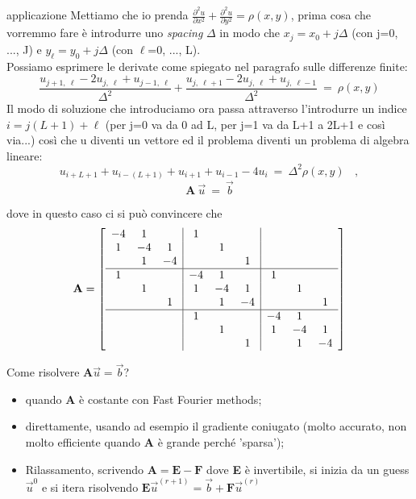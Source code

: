 \documentclass{article}
\begin{document}
	\begin{dimostrazione}{applicazione}
		Mettiamo che io prenda $\displaystyle\frac{\partial^2 u}{\partial x^2} +  \frac{\partial^2 u}{\partial y^2} = \rho(x, y)$, prima cosa che vorremmo fare è introdurre uno \emph{spacing} $\Delta$ in modo che ${x_j}=x_0+j\Delta$ (con j=0, ..., J) e ${y_\ell}=y_0+j\Delta$ (con $\ell$=0, ..., L).\\
		Possiamo esprimere le derivate come spiegato nel paragrafo sulle differenze finite:
		\[\frac{u_{j+1,\ \ell}-2u_{j,\ \ell} + u_{j-1,\ \ell}}{\Delta^2} + \frac{u_{j,\ \ell+1}-2u_{j,\ \ell} + u_{j,\ \ell-1}}{\Delta^2}\ =\ \rho(x, y)\]
		Il modo di soluzione che introduciamo ora passa attraverso l'introdurre un indice $i=j(L+1)+\ell$ (per j=0 va da 0 ad L, per j=1 va da L+1 a 2L+1 e così via...) così che u diventi un vettore ed il problema diventi un problema di algebra lineare:
		\[ u_{i+L+1}+u_{i-(L+1)} + u_{i+1} + u_{i-1} - 4u_i \ =\ \Delta^2 \rho(x, y)\ \ \ \ ,\]
		\[ \textbf{A}\ \vec u\ = \ \vec b \]
		
		dove in questo caso ci si può convincere che 
		\[\textbf{A}=\left[
		\begin{array}{ccc|ccc|ccc}
			-4 & 1 &  & 1 & &  &  &  &  \\
			1 & -4 & 1 &  & 1 &  &  &  & \\
			& 1 & -4 &  &  & 1 &  &  &  \\
			\hline
			1 &  &  & -4 & 1 &  & 1 &  &  \\
			& 1 &  & 1 & -4 & 1 &  & 1 &  \\
			&  & 1 &  & 1 & -4 &  &  & 1 \\
			\hline
			&  & & 1 &  &  & -4 & 1 &  \\
			&  & & & 1 &  & 1 & -4 & 1 \\
			& & & & & 1 & & 1 & -4 \\
		\end{array}
		\right]
		\]
		
		
		Come risolvere $\textbf{A}\vec u = \vec b$? 
		\begin{itemize}
			\item quando \textbf{A} è costante con Fast Fourier methods;
			\item direttamente, usando ad esempio il gradiente coniugato (molto accurato, non molto efficiente quando \textbf{A} è grande perché 'sparsa');
			\item Rilassamento, scrivendo $\textbf{A}=\textbf{E}-\textbf{F}$ dove \textbf{E} è invertibile, si inizia da un guess $\vec u^{0}$ e si itera risolvendo $\textbf{E} \vec{u}^{(r+1)}=\vec b + \textbf{F} \vec u^{(r)}$
		\end{itemize}
	\end{dimostrazione}
	
\end{document}
